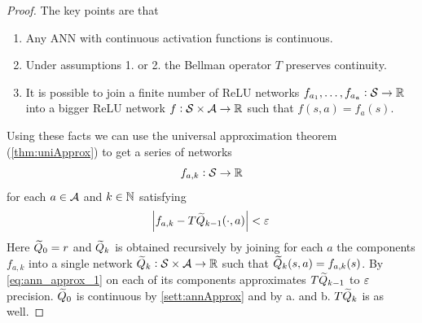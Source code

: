 \begin{proof}[Proof]
  The key points are that
  \begin{enumerate}[label=\alph*.]
    \item Any ANN with continuous activation functions is continuous.
    \item Under assumptions 1. or 2. the Bellman operator $T$ preserves
      continuity.
    \item It is possible to join a finite number of ReLU networks
      $f_{a_1}, \dots, f_{a_\frak{a}} : \mathcal{S} \to \mathbb{R}$
      into a bigger ReLU network $f : \mathcal{S} \times \mathcal{A} \to \mathbb{R}$
      such that $f(s, a) = f_a(s)$.
  \end{enumerate}

  Using these facts we can use the universal approximation theorem
  (\cref{thm:uniApprox}) to get a series of networks
  \[ f_{a, k} : \mathcal{S} \to \mathbb{R} \]
  for each $a \in \mathcal{A}$ and $k \in \mathbb{N}$ satisfying
  \begin{equation}
    \abs{f_{a, k} - T \widetilde{Q}_{k-1}(\cdot, a)} < \varepsilon
    \label{eq:ann_approx_1}
  \end{equation}
  Here $\widetilde{Q}_0 = r$ and $\widetilde{Q}_k$ is obtained recursively by
  joining for each $a$ the components $f_{a, k}$ into a single network
  $\widetilde{Q}_k : \mathcal{S} \times \mathcal{A} \to \mathbb{R}$ such that
  $\widetilde{Q}_k(s, a) = f_{a, k}(s)$.
  By \cref{eq:ann_approx_1} on each of its components
  approximates $T \widetilde{Q}_{k-1}$ to $\varepsilon$ precision.
  $\widetilde{Q}_0$ is continuous by \cref{sett:annApprox} and by
  a. and b. $T \widetilde{Q}_k$ is as well.
  

\end{proof}
